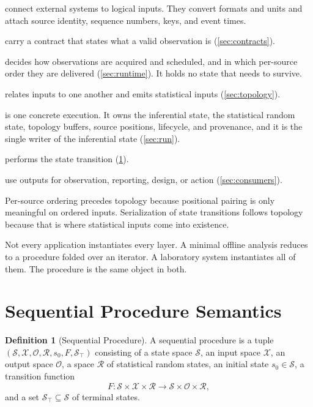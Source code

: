 \documentclass[11pt,a4paper]{article}
\theoremstyle{definition}
\newtheorem{definition}{Definition}
\theoremstyle{remark}
\newcommand{\State}{\mathcal{S}}
\newcommand{\Input}{\mathcal{X}}
\newcommand{\Output}{\mathcal{O}}
\newcommand{\Random}{\mathcal{R}}
\newcommand{\Term}{\State_{\top}}
\begin{document}
\begin{description}[leftmargin=2em,style=nextline,itemsep=2pt]
    \item[Adapters] connect external systems to logical inputs. They
    convert formats and units and attach source identity, sequence
    numbers, keys, and event times.
    \item[Logical inputs] carry a contract that states what a valid
    observation is (\cref{sec:contracts}).
    \item[Runtime] decides how observations are acquired and scheduled,
    and in which per-source order they are delivered
    (\cref{sec:runtime}). It holds no state that needs to survive.
    \item[Data topology] relates inputs to one another and emits
    statistical inputs (\cref{sec:topology}).
    \item[Run] is one concrete execution. It owns the inferential state,
    the statistical random state, topology buffers, source positions,
    lifecycle, and provenance, and it is the single writer of the
    inferential state (\cref{sec:run}).
    \item[Sequential Procedure] performs the state transition
    (\cref{sec:procedure}).
    \item[Scientific consumers] use outputs for observation, reporting,
    design, or action (\cref{sec:consumers}).
\end{description}

Per-source ordering precedes topology because positional pairing is only
meaningful on ordered inputs. Serialization of state transitions follows
topology because that is where statistical inputs come into existence.

Not every application instantiates every layer. A minimal offline
analysis reduces to a procedure folded over an iterator. A laboratory
system instantiates all of them. The procedure is the same object in
both.

\section{Sequential Procedure Semantics}
\label{sec:procedure}

\begin{definition}[Sequential Procedure]
\label{def:procedure}
A sequential procedure is a tuple
$(\State,\Input,\Output,\Random,s_0,F,\Term)$ consisting of a state space
$\State$, an input space $\Input$, an output space $\Output$, a space
$\Random$ of statistical random states, an initial state
$s_0\in\State$, a transition function
\[
F:\State\times\Input\times\Random\to\State\times\Output\times\Random ,
\]
and a set $\Term\subseteq\State$ of terminal states.
\end{definition}
\end{document}

